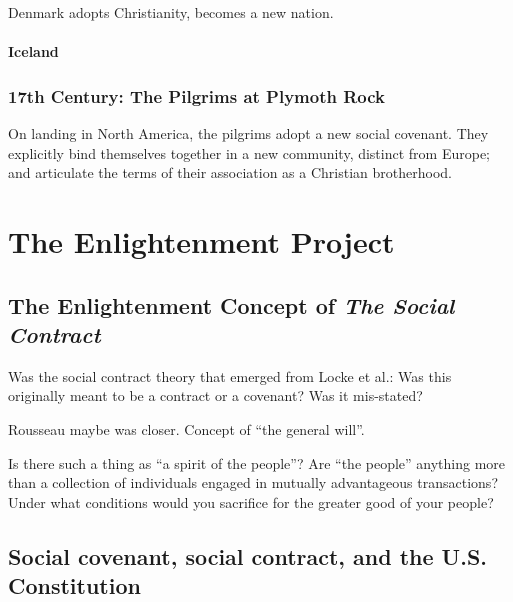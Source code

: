 \documentclass[
]{book}
\begin{document}
Denmark adopts Christianity, becomes a new nation.

\hypertarget{iceland}{%
\subsection{Iceland}\label{iceland}}

\hypertarget{th-century-the-pilgrims-at-plymoth-rock}{%
\section{17th Century: The Pilgrims at Plymoth Rock}\label{th-century-the-pilgrims-at-plymoth-rock}}

On landing in North America, the pilgrims adopt a new social covenant. They explicitly bind themselves together in a new community, distinct from Europe; and articulate the terms of their association as a Christian brotherhood.

\hypertarget{part-the-enlightenment-project}{%
\part{The Enlightenment Project}\label{part-the-enlightenment-project}}

\hypertarget{the-enlightenment-concept-of-the-social-contract}{%
\chapter{\texorpdfstring{The Enlightenment Concept of \emph{The Social Contract}}{The Enlightenment Concept of The Social Contract}}\label{the-enlightenment-concept-of-the-social-contract}}

Was the social contract theory that emerged from Locke et al.: Was this
originally meant to be a contract or a covenant? Was it mis-stated?

Rousseau maybe was closer. Concept of ``the general will''.

Is there such a thing as ``a spirit of the people''?
Are ``the people'' anything more than a collection of individuals engaged in mutually advantageous transactions?
Under what conditions would you sacrifice for the greater good of your people?

\hypertarget{social-covenant-social-contract-and-the-u.s.-constitution}{%
\chapter{Social covenant, social contract, and the U.S. Constitution}\label{social-covenant-social-contract-and-the-u.s.-constitution}}
\end{document}
